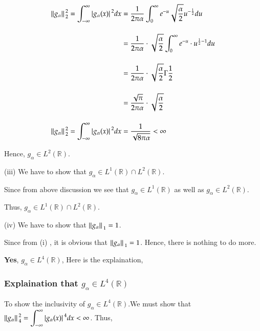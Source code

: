 \documentclass[12pt, a4paper]{article} %
\begin{document}
\begin{equation*}
    \begin{split}
        \norm*{g_{\alpha}}_2^2 = \int_{-\infty}^{\infty}\abs*{g_{\alpha} (x)}^2 dx & = \frac{1}{2\pi \alpha}\int_{0}^{\infty}e^{-u}\sqrt{\frac{\alpha}{2}}u^{-\frac{1}{2}}du\\[4mm]
        & = \frac{1}{2\pi \alpha}\cdot \sqrt{\frac{\alpha}{2}}\int_{0}^{\infty}e^{-u}\cdot u^{\frac{1}{2}-1}du\\[4mm]
        & = \frac{1}{2\pi \alpha}\cdot \sqrt{\frac{\alpha}{2}}\Gamma\frac{1}{2}\\[4mm]
        & = \frac{\sqrt{\pi}}{2\pi \alpha}\cdot \sqrt{\frac{\alpha}{2}}\\[4mm]
        \norm*{g_{\alpha}}_2^2 = \int_{-\infty}^{\infty}\abs*{g_{\alpha} (x)}^2 dx & = \frac{1}{\sqrt{8\pi \alpha}} < \infty
    \end{split}
\end{equation*}

Hence, $g_\alpha \in L^2(\mathbb{R})$.

\vspace*{1cm}

(iii) We have to show that $g_\alpha \in L^1(\mathbb{R})\cap L^2(\mathbb{R})$.

Since from above discussion we see that $g_\alpha \in L^1(\mathbb{R})$ as well as $g_\alpha \in L^2(\mathbb{R})$.

Thus, $g_\alpha \in L^1(\mathbb{R})\cap L^2(\mathbb{R})$.

\vspace*{1cm}

(iv) We have to show that $\norm*{g_\alpha}_1 = 1$.

Since from (i) , it is obvious that $\norm*{g_\alpha}_1 = 1$.
Hence, there is nothing to do more.

\pagebreak

{\bf Yes}, $g_\alpha \in L^4(\mathbb{R})$, Here is the explaination,

\subsubsection*{Explaination that $g_\alpha \in L^4(\mathbb{R})$}
\BgThispage
To show the inclusivity of $g_\alpha \in L^4(\mathbb{R})$.We must show that $\displaystyle \norm*{g_{\alpha}}_4^2 = \int_{-\infty}^{\infty}\abs*{g_{\alpha} (x)}^4dx  < \infty$. Thus,
\end{document}
